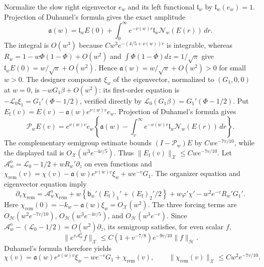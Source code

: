 \documentclass[mnsc]{informs3}
\begin{document}
\begin{APPENDICES}
{Normalize the slow right eigenvector $e_w$ and its left functional
$\mathfrak l_w$ by $\mathfrak l_w(e_w)=1$. Projection of Duhamel's formula gives the
exact amplitude
\[
\mathfrak a(w)=\mathfrak l_wE(0)+\int_0^\infty e^{-\nu(w)r}
\mathfrak l_w\mathscr N_w(E(r))\,dr.
\]
The integral is $O(w^3)$ because
$Cw^3e^{-(4/5+\nu(w))r}$ is integrable, whereas
$R_w=1-w\Phi(1-\Phi)+O(w^2)$ and
$\int\Phi(1-\Phi)dz=1/\sqrt\pi$ give
$\mathfrak l_wE(0)=w/\sqrt\pi+O(w^2)$. Hence
$\mathfrak a(w)=w/\sqrt\pi+O(w^2)>0$ for small $w>0$.
The designer component $\xi_w$ of the eigenvector, normalized to
$(G_1,0,0)$ at $w=0$, is
$-wG_1\beta+O(w^2)$: its first-order equation is
$-\mathscr L_0\xi_1=G_1'(\Phi-1/2)$, verified directly by
$\mathscr L_0(G_1\beta)=G_1'(\Phi-1/2)$.
Put $E_{\mathrm f}(v)=E(v)-\mathfrak a(w)e^{\nu(w)v}e_w$.
Projection of Duhamel's formula gives
\[
\mathscr P_wE(v)=e^{\nu(w)v}e_w
\left\{\mathfrak a(w)-\int_v^\infty e^{-\nu(w)r}
\mathfrak l_w\mathscr N_w(E(r))\,dr\right\}.
\]
The complementary semigroup estimate bounds $(I-\mathscr P_w)E$ by
$Cwe^{-7v/10}$, while the displayed tail is $O_{\mathscr X}(w^3e^{-4v/5})$.
Thus $\|E_{\mathrm f}(v)\|_{\mathscr X}\leq Cwe^{-7v/10}$.
Let $\mathcal A_w^{\mathrm o}=\mathscr L_0-1/2+wR_w'\partial_z$ on even functions and
$\chi_{\mathrm{rem}}(v)=\chi(v)-\mathfrak a(w)e^{\nu(w)v}\xi_w+we^{-v}G_1$.
The organizer equation and eigenvector equation imply
\[
 \partial_v\chi_{\mathrm{rem}}=\mathcal A_w^{\mathrm o}\chi_{\mathrm{rem}}+w\left\{\mathsf b_w'(E_{\mathrm f})_1'
 +(E_{\mathrm f})_2'/2\right\}
 +w\varphi'\chi'-w^2e^{-v}R_w'G_1'.
\]
Here $\chi_{\mathrm{rem}}(0)=-k_w-\mathfrak a(w)\xi_w=O_{\mathscr X}(w^2)$.
The three forcing terms are $O_{\mathscr H}(w^2e^{-7v/10})$,
$O_{\mathscr H}(w^3e^{-4v/5})$, and $O_{\mathscr H}(w^3e^{-v})$.
Since $\mathcal A_w^{\mathrm o}-(\mathscr L_0-1/2)=O(w^2)\partial_z$,
its semigroup satisfies, for even scalar $f$,
\[
\|e^{v\mathcal A_w^{\mathrm o}}f\|_{\mathscr X}
\leq C(1+v^{-7/8})e^{-9v/10}\|f\|_{\mathscr H}.
\]
Duhamel's formula therefore yields
\begin{equation}\label{eq-design-fast-mode-remainder}
\chi(v)=\mathfrak a(w)e^{\nu(w)v}\xi_w-we^{-v}G_1+\chi_{\mathrm{rem}}(v),
\qquad \|\chi_{\mathrm{rem}}(v)\|_{\mathscr X}\leq Cw^2e^{-7v/10}.
\end{equation}

}
\end{APPENDICES}
\end{document}
